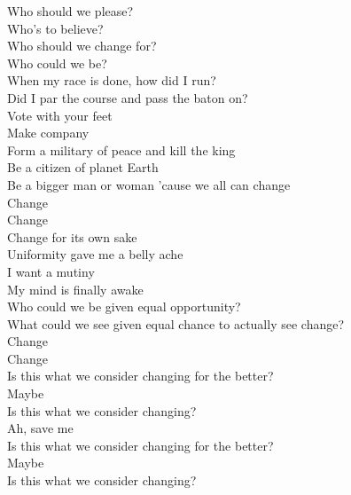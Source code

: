 




Who should we please? \\
Who's to believe? \\
Who should we change for? \\
Who could we be? \\
When my race is done, how did I run? \\
Did I par the course and pass the baton on? \\

Vote with your feet \\
Make company \\
Form a military of peace and kill the king \\
Be a citizen of planet Earth \\
Be a bigger man or woman 'cause we all can change \\

Change \\
Change \\

Change for its own sake \\
Uniformity gave me a belly ache \\
I want a mutiny \\
My mind is finally awake \\
Who could we be given equal opportunity? \\
What could we see given equal chance to actually see change? \\

Change \\
Change \\

Is this what we consider changing for the better? \\
Maybe \\

Is this what we consider changing? \\
Ah, save me \\
Is this what we consider changing for the better? \\
Maybe \\
Is this what we consider changing? \\

